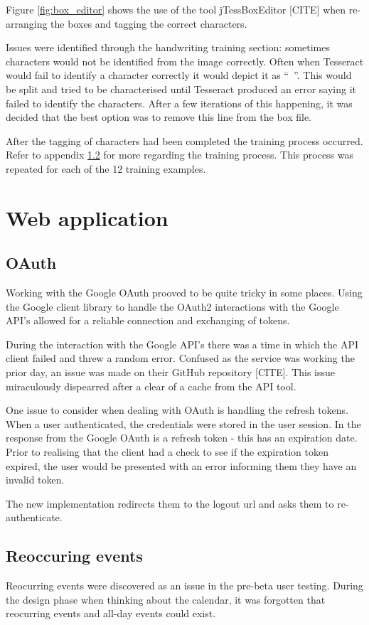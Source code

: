Figure \ref{fig:box_editor} shows the use of the tool jTessBoxEditor [CITE] when re-arranging the boxes and tagging the correct characters.

Issues were identified through the handwriting training section: sometimes characters would not be identified from the image correctly. Often when Tesseract would fail to identify a character correctly it would depict it as ``~''. This would be split and tried to be characterised until Tesseract produced an error saying it failed to identify the characters. After a few iterations of this happening, it was decided that the best option was to remove this line from the box file.

After the tagging of characters had been completed the training process occurred. Refer to appendix \ref{} for more regarding the training process. This process was repeated for each of the 12 training examples.

\section{Web application}

\subsection{OAuth}
Working with the Google OAuth prooved to be quite tricky in some places. Using the Google client library to handle the OAuth2 interactions with the Google API's allowed for a reliable connection and exchanging of tokens.

During the interaction with the Google API's there was a time in which the API client failed and threw a random error. Confused as the service was working the prior day, an issue was made on their GitHub repository [CITE]. This issue miraculously dispearred after a clear of a cache from the API tool.

One issue to consider when dealing with OAuth is handling the refresh tokens. When a user authenticated, the credentials were stored in the user session. In the response from the Google OAuth is a refresh token - this has an expiration date. Prior to realising that the client had a check to see if the expiration token expired, the user would be presented with an error informing them they have an invalid token.

The new implementation redirects them to the logout url and asks them to re-authenticate.

\subsection{Reoccuring events}
Reocurring events were discovered as an issue in the pre-beta user testing. During the design phase when thinking about the calendar, it was forgotten that reocurring events and all-day events could exist.

